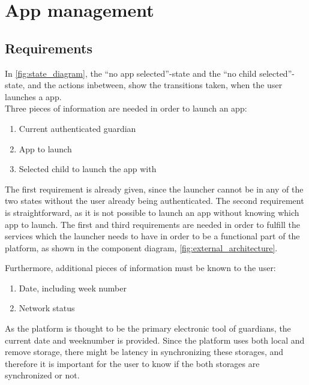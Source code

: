 \section{App management}
\label{sec:app_management}

\subsection{Requirements}
\label{sec:appman_requirements}

In \autoref{fig:state_diagram}, the ``no app selected''-state and the ``no child selected''-state, and the actions inbetween, show the transitions taken, when the user launches a \giraf[] app. \\


\noindent Three pieces of information are needed in order to launch an app:

\begin{enumerate}
	\item Current authenticated guardian
	\item App to launch
	\item Selected child to launch the app with
\end{enumerate}

The first requirement is already given, since the launcher cannot be in any of the two states without the user already being authenticated.
The second requirement is straightforward, as it is not possible to launch an app without knowing which app to launch.
The first and third requirements are needed in order to fulfill the services which the launcher needs to have in order to be a functional part of the \giraf[] platform, as shown in the component diagram, \autoref{fig:external_architecture}.

Furthermore, additional pieces of information must be known to the user:

\begin{enumerate}
	\item Date, including week number
	\item Network status 
\end{enumerate}

As the \giraf[] platform is thought to be the primary electronic tool of guardians, the current date and weeknumber is provided.
Since the \giraf[] platform uses both local and remove storage, there might be latency in synchronizing these storages, and therefore it is important for the user to know if the both storages are synchronized or not.

